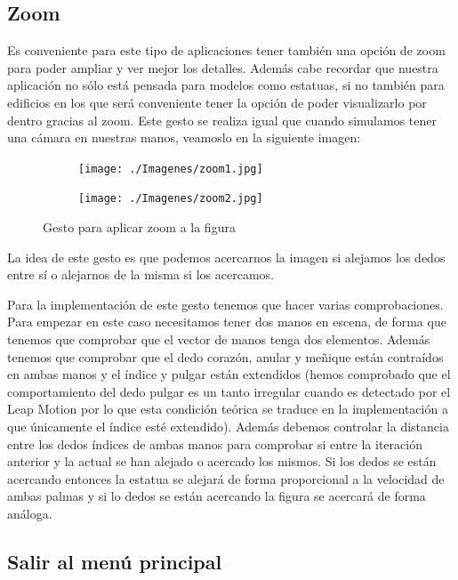 \documentclass[a4paper,11pt]{article}
\begin{document}
\subsection{Zoom}

Es conveniente para este tipo de aplicaciones tener también una opción de zoom para poder ampliar y ver mejor los detalles. Además cabe recordar que nuestra aplicación no sólo está pensada para modelos como estatuas, si no también para edificios en los que será conveniente tener la opción de poder visualizarlo por dentro gracias al zoom. Este gesto se realiza igual que cuando simulamos tener una cámara en nuestras manos, veamoslo en la siguiente imagen:

\begin{figure}[!h]
	\centering
	\begin{subfigure}{0.48\textwidth}
		\centering
		\texttt{[image: ./Imagenes/zoom1.jpg]}
	\end{subfigure}
	\begin{subfigure}{0.48\textwidth}
		\centering
		\texttt{[image: ./Imagenes/zoom2.jpg]}
	\end{subfigure}
	\caption{Gesto para aplicar zoom a la figura}
	\label{gesto4}
\end{figure}

La idea de este gesto es que podemos acercarnos la imagen si alejamos los dedos entre sí o alejarnos de la misma si los acercamos.

\vspace{10px}

Para la implementación de este gesto tenemos que hacer varias comprobaciones. Para empezar en este caso necesitamos tener dos manos en escena, de forma que tenemos que comprobar que el vector de manos tenga dos elementos. Además tenemos que comprobar que el dedo corazón, anular y meñique están contraídos en ambas manos y el índice y pulgar están extendidos (hemos comprobado que el comportamiento del dedo pulgar es un tanto irregular cuando es detectado por el Leap Motion por lo que esta condición teórica se traduce en la implementación a que únicamente el índice esté extendido). Además debemos controlar la distancia entre los dedos índices de ambas manos para comprobar si entre la iteración anterior y la actual se han alejado o acercado los mismos. Si los dedos se están acercando entonces la estatua se alejará de forma proporcional a la velocidad de ambas palmas y si lo dedos se están acercando la figura se acercará de forma análoga.

\subsection{Salir al menú principal}
\end{document}
